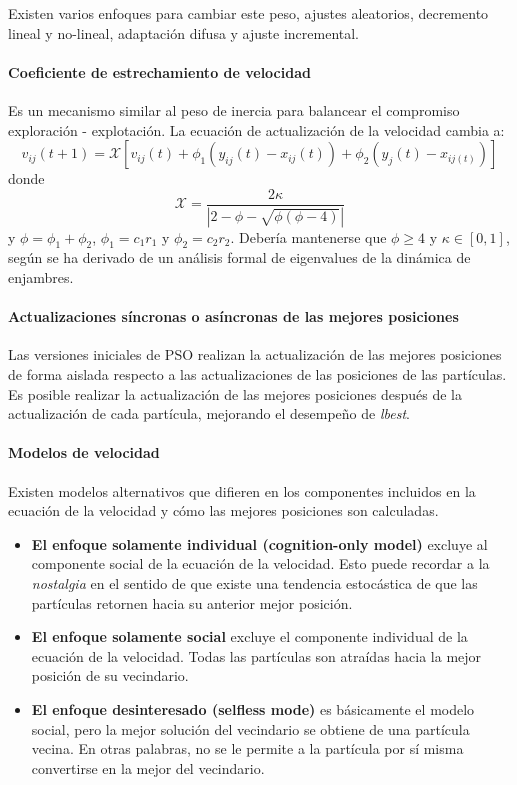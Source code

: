 \documentclass{article}
\begin{document}
Existen varios enfoques para cambiar este peso, ajustes aleatorios, decremento lineal y no-lineal, adaptación difusa y ajuste incremental.

\paragraph{Coeficiente de estrechamiento de velocidad}
Es un mecanismo similar al peso de inercia para balancear el compromiso exploración - explotación.
La ecuación de actualización de la velocidad cambia a:
\begin{equation}
	v_{ij}(t+1) = \mathcal{X} [ v_{ij}(t) + \phi_1 (y_{ij}(t) - x_{ij}(t)) + \phi_2(\hat{y}_j(t) - x_{ij(t)})   ]
\end{equation}
donde
$$
\mathcal{X} = \frac{2 \kappa}{| 2 - \phi - \sqrt{\phi ( \phi - 4)}  |}
$$
y $\phi = \phi_1 + \phi_2$, $\phi_1 = c_1 r_1$ y $\phi_2 = c_2 r_2$.
Debería mantenerse que  $\phi \geq 4$ y $\kappa \in [0,1]$, según se ha derivado de un análisis formal de eigenvalues de la dinámica de enjambres.


\paragraph{Actualizaciones síncronas o asíncronas de las mejores posiciones}
Las versiones iniciales de PSO realizan la actualización de las mejores posiciones de forma aislada respecto a las actualizaciones de las posiciones de las partículas.
Es posible realizar la actualización de las mejores posiciones después de la actualización de cada partícula, mejorando el desempeño de \emph{lbest}.

\paragraph{Modelos de velocidad}
Existen modelos alternativos que difieren en los componentes incluidos en la ecuación de la velocidad y cómo las mejores posiciones son calculadas.
\begin{itemize}
	\item \textbf{El enfoque solamente individual (cognition-only model)} excluye al componente social de la ecuación de la velocidad.
	Esto puede recordar a la \emph{nostalgia} en el sentido de que existe una tendencia estocástica de que las partículas retornen hacia su anterior mejor posición.
	\item \textbf{El enfoque solamente social} excluye el componente individual de la ecuación de la velocidad.
	Todas las partículas son atraídas hacia la mejor posición de su vecindario.
	\item \textbf{El enfoque desinteresado (selfless mode)} es básicamente el modelo social, pero la mejor solución del vecindario se obtiene de una partícula vecina.
	En otras palabras, no se le permite a la partícula por sí misma convertirse en la mejor del vecindario.
\end{itemize}
\end{document}
